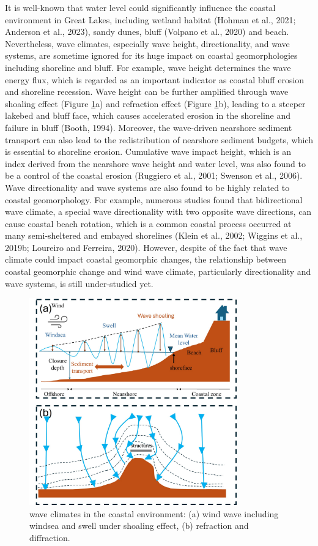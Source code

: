 It is well-known that water level could significantly influence the coastal environment in Great Lakes, including wetland habitat (Hohman et al., 2021; Anderson et al., 2023), sandy dunes, bluff (Volpano et al., 2020) and beach.  Nevertheless, wave climates, especially wave height, directionality, and wave systems, are sometime ignored for its huge impact on coastal geomorphologies including shoreline and bluff. For example, wave height determines the wave energy flux, which is regarded as an important indicator as coastal bluff erosion and shoreline recession. Wave height can be further amplified through wave shoaling effect (Figure \ref{fig:fig1.5}a) and refraction effect (Figure \ref{fig:fig1.5}b), leading to a steeper lakebed and bluff face, which causes accelerated erosion in the shoreline and failure in bluff (Booth, 1994). Moreover, the wave-driven nearshore sediment transport can also lead to the redistribution of nearshore sediment budgets, which is essential to shoreline erosion. Cumulative wave impact height, which is an index derived from the nearshore wave height and water level, was also found to be a control of the coastal erosion (Ruggiero et al., 2001; Swenson et al., 2006). Wave directionality and wave systems are also found to be highly related to coastal geomorphology. For example, numerous studies found that bidirectional wave climate, a special wave directionality with two opposite wave directions, can cause coastal beach rotation, which is a common coastal process occurred at many semi-sheltered and embayed shorelines (Klein et al., 2002; Wiggins et al., 2019b; Loureiro and Ferreira, 2020). However, despite of the fact that wave climate could impact coastal geomorphic changes, the relationship between coastal geomorphic change and wind wave climate, particularly directionality and wave systems, is still under-studied yet. 

\begin{figure}[htbp]
  \centering
  \includegraphics[width=0.8\textwidth]{chapter1/resources/figure1-5.jpg}
  \caption{wave climates in the coastal environment: (a) wind wave including windsea and swell under shoaling effect, (b) refraction and diffraction.}
  \label{fig:fig1.5}
\end{figure}


